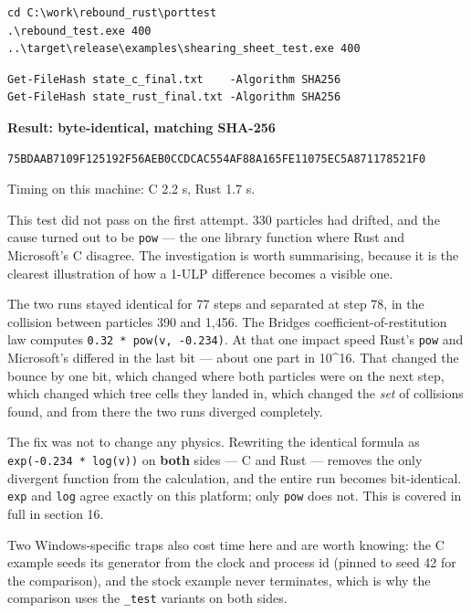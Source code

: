 \documentclass[11pt]{article}
\begin{document}
\begin{lstlisting}
cd C:\work\rebound_rust\porttest
.\rebound_test.exe 400
..\target\release\examples\shearing_sheet_test.exe 400
\end{lstlisting}

\begin{lstlisting}
Get-FileHash state_c_final.txt    -Algorithm SHA256
Get-FileHash state_rust_final.txt -Algorithm SHA256
\end{lstlisting}

\textbf{Result: byte-identical, matching SHA-256}

\begin{lstlisting}
75BDAAB7109F125192F56AEB0CCDCAC554AF88A165FE11075EC5A871178521F0
\end{lstlisting}

Timing on this machine: C 2.2 s, Rust 1.7 s.

This test did not pass on the first attempt. 330 particles had drifted, and the cause turned out to be \texttt{pow} --- the one library function where Rust and Microsoft's C disagree. The investigation is worth summarising, because it is the clearest illustration of how a 1-ULP difference becomes a visible one.

The two runs stayed identical for 77 steps and separated at step 78, in the collision between particles 390 and 1,456. The Bridges coefficient-of-restitution law computes \texttt{0.32 * pow(v, -0.234)}. At that one impact speed Rust's \texttt{pow} and Microsoft's differed in the last bit --- about one part in 10\textasciicircum{}16. That changed the bounce by one bit, which changed where both particles were on the next step, which changed which tree cells they landed in, which changed the \emph{set} of collisions found, and from there the two runs diverged completely.

The fix was not to change any physics. Rewriting the identical formula as \texttt{exp(-0.234 * log(v))} on \textbf{both} sides --- C and Rust --- removes the only divergent function from the calculation, and the entire run becomes bit-identical. \texttt{exp} and \texttt{log} agree exactly on this platform; only \texttt{pow} does not. This is covered in full in section 16.

Two Windows-specific traps also cost time here and are worth knowing: the C example seeds its generator from the clock and process id (pinned to seed 42 for the comparison), and the stock example never terminates, which is why the comparison uses the \texttt{\_test} variants on both sides.
\end{document}
